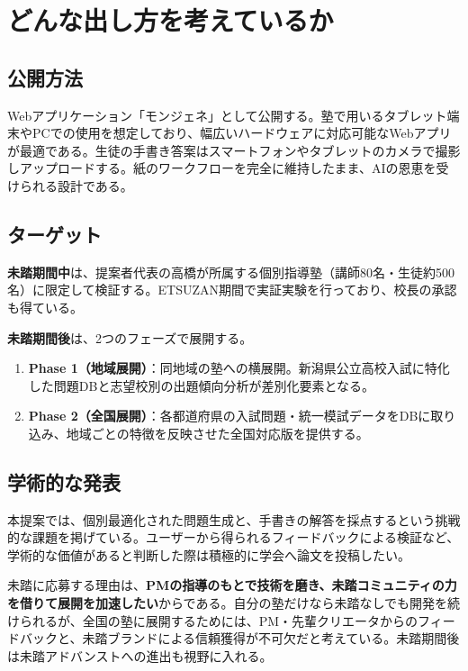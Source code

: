\documentclass[paper=a4,fontsize=10.5bp,jafontsize=10.5bp,twocolumn]{jlreq}
\begin{document}
\section{どんな出し方を考えているか}

\subsection{公開方法}

Webアプリケーション「モンジェネ」として公開する。塾で用いるタブレット端末やPCでの使用を想定しており、幅広いハードウェアに対応可能なWebアプリが最適である。生徒の手書き答案はスマートフォンやタブレットのカメラで撮影しアップロードする。紙のワークフローを完全に維持したまま、AIの恩恵を受けられる設計である。

\subsection{ターゲット}

\textbf{未踏期間中}は、提案者代表の高橋が所属する個別指導塾（講師80名・生徒約500名）に限定して検証する。ETSUZAN期間で実証実験を行っており、校長の承認も得ている。

\textbf{未踏期間後}は、2つのフェーズで展開する。

\begin{enumerate}[leftmargin=1.5em]
  \item \textbf{Phase 1（地域展開）}：同地域の塾への横展開。新潟県公立高校入試に特化した問題DBと志望校別の出題傾向分析が差別化要素となる。
  \item \textbf{Phase 2（全国展開）}：各都道府県の入試問題・統一模試データをDBに取り込み、地域ごとの特徴を反映させた全国対応版を提供する。
\end{enumerate}

\subsection{学術的な発表}

本提案では、個別最適化された問題生成と、手書きの解答を採点するという挑戦的な課題を掲げている。ユーザーから得られるフィードバックによる検証など、学術的な価値があると判断した際は積極的に学会へ論文を投稿したい。

未踏に応募する理由は、\textbf{PMの指導のもとで技術を磨き、未踏コミュニティの力を借りて展開を加速したい}からである。自分の塾だけなら未踏なしでも開発を続けられるが、全国の塾に展開するためには、PM・先輩クリエータからのフィードバックと、未踏ブランドによる信頼獲得が不可欠だと考えている。未踏期間後は未踏アドバンストへの進出も視野に入れる。
\end{document}
